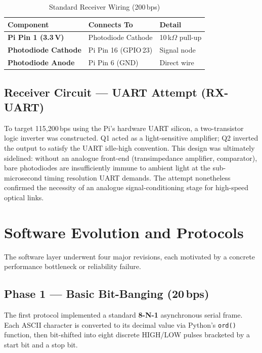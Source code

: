 \documentclass[10pt, twocolumn, a4paper]{article}
\begin{document}
\begin{table}[H]
\centering
\caption{Standard Receiver Wiring (200\,bps)}
\label{tab:rx}
\renewcommand{\arraystretch}{1.2}
\begin{tabularx}{\linewidth}{@{}>{\bfseries}l l X@{}}
\toprule
Component & Connects To & Detail \\
\midrule
Pi Pin 1 (3.3\,V)    & Photodiode Cathode & 10\,k$\Omega$ pull-up \\
Photodiode Cathode   & Pi Pin 16 (GPIO\,23) & Signal node \\
Photodiode Anode     & Pi Pin 6 (GND) & Direct wire \\
\bottomrule
\end{tabularx}
\end{table}

\subsection{Receiver Circuit — UART Attempt (RX-UART)}

To target 115,200\,bps using the Pi's hardware UART silicon, a two-transistor logic inverter was constructed. Q1 acted as a light-sensitive amplifier; Q2 inverted the output to satisfy the UART idle-high convention. This design was ultimately sidelined: without an analogue front-end (transimpedance amplifier, comparator), bare photodiodes are insufficiently immune to ambient light at the sub-microsecond timing resolution UART demands. The attempt nonetheless confirmed the necessity of an analogue signal-conditioning stage for high-speed optical links.

\section{Software Evolution and Protocols}

The software layer underwent four major revisions, each motivated by a concrete performance bottleneck or reliability failure.

\subsection{Phase 1 — Basic Bit-Banging (20\,bps)}

The first protocol implemented a standard \textbf{8-N-1} asynchronous serial frame. Each ASCII character is converted to its decimal value via Python's \texttt{ord()} function, then bit-shifted into eight discrete HIGH/LOW pulses bracketed by a start bit and a stop bit.
\end{document}
